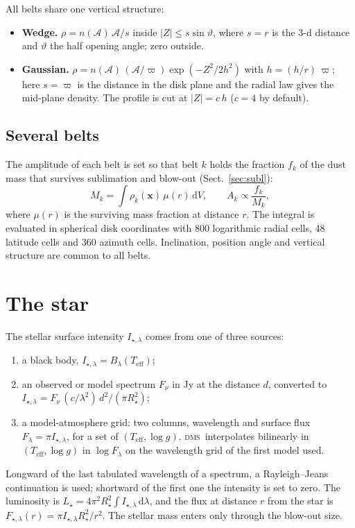 \documentclass[11pt,a4paper]{article}
\newcommand{\dms}{\textsc{dms}}
\newcommand{\dd}{\mathrm{d}}
\begin{document}
All belts share one vertical structure:
\begin{itemize}
\item \textbf{Wedge.} $\rho = n(\mathcal{A})\,\mathcal{A}/s$ inside $|Z|\le s\sin\vartheta$, where
      $s=r$ is the 3-d distance and $\vartheta$ the half opening angle; zero outside.
\item \textbf{Gaussian.} $\rho = n(\mathcal{A})\,(\mathcal{A}/\varpi)\exp(-Z^2/2h^2)$ with
      $h=(h/r)\,\varpi$; here $s=\varpi$ is the distance in the disk plane and the radial law gives
      the mid-plane density. The profile is cut at $|Z| = c\,h$ ($c=4$ by default).
\end{itemize}

\subsection{Several belts}

The amplitude of each belt is set so that belt $k$ holds the fraction $f_k$ of the dust mass that
survives sublimation and blow-out (Sect.~\ref{sec:subl}):
\begin{equation}
M_k = \int \rho_k(\mathbf{x})\,\mu(r)\,\dd V,\qquad A_k \propto \frac{f_k}{M_k},
\end{equation}
where $\mu(r)$ is the surviving mass fraction at distance $r$. The integral is evaluated in
spherical disk coordinates with 800 logarithmic radial cells, 48 latitude cells and 360 azimuth
cells. Inclination, position angle and vertical structure are common to all belts.

\section{The star}
\label{sec:star}

The stellar surface intensity $I_{\star,\lambda}$ comes from one of three sources:
\begin{enumerate}
\item a black body, $I_{\star,\lambda}=B_\lambda(T_\mathrm{eff})$;
\item an observed or model spectrum $F_{\nu}$ in Jy at the distance $d$, converted to
      $I_{\star,\lambda} = F_\nu\,(c/\lambda^2)\,d^2/(\pi R_\star^2)$;
\item a model-atmosphere grid: two columns, wavelength and surface flux
      $F_\lambda=\pi I_{\star,\lambda}$, for a set of $(T_\mathrm{eff},\log g)$. \dms\ interpolates
      bilinearly in $(T_\mathrm{eff},\log g)$ in $\log F_\lambda$ on the wavelength grid of the
      first model used.
\end{enumerate}
Longward of the last tabulated wavelength of a spectrum, a Rayleigh--Jeans continuation is used;
shortward of the first one the intensity is set to zero.
The luminosity is $L_\star = 4\pi^2R_\star^2\int I_{\star,\lambda}\,\dd\lambda$, and the flux at
distance $r$ from the star is $F_{\star,\lambda}(r)=\pi I_{\star,\lambda}R_\star^2/r^2$. The
stellar mass enters only through the blow-out size.
\end{document}
